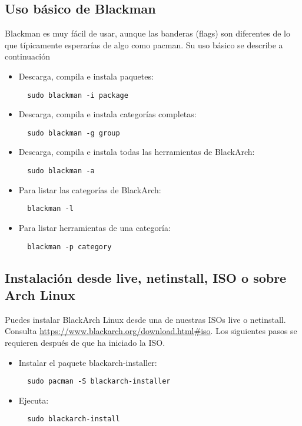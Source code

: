 \documentclass[a4paper, oneside, 11pt]{book}
\begin{document}
\subsection{Uso básico de Blackman} 
Blackman es muy fácil de usar, aunque las banderas (flags) son diferentes de lo que típicamente
esperarías de algo como pacman. Su uso básico se describe a continuación
\begin{itemize}
\item Descarga, compila e instala paquetes:
\begin{lstlisting}
  sudo blackman -i package
\end{lstlisting}

\item Descarga, compila e instala categorías completas:
\begin{lstlisting}
  sudo blackman -g group
\end{lstlisting}

\item Descarga, compila e instala todas las herramientas de BlackArch:
\begin{lstlisting}
  sudo blackman -a
\end{lstlisting}

\item Para listar las categorías de BlackArch:
\begin{lstlisting}
  blackman -l
\end{lstlisting}

\item Para listar herramientas de una categoría:
\begin{lstlisting}
  blackman -p category
\end{lstlisting}

\end{itemize}

\subsection{Instalación desde live, netinstall, ISO o sobre Arch Linux}
Puedes instalar BlackArch Linux desde una de nuestras ISOs live o netinstall.\\Consulta
\url{https://www.blackarch.org/download.html#iso}. Los siguientes pasos se
requieren después de que ha iniciado la ISO.
\begin{itemize}
\item Instalar el paquete blackarch-installer:
\begin{lstlisting}
  sudo pacman -S blackarch-installer
\end{lstlisting}

\item Ejecuta:
\begin{lstlisting}
  sudo blackarch-install
\end{lstlisting}

\end{itemize}
\end{document}
